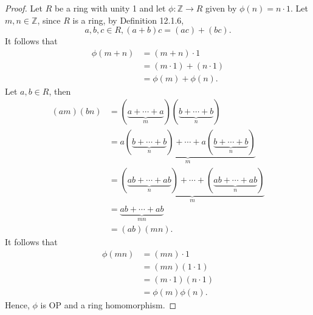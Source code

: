 \documentclass{article}
\newtheorem{theorem}{Theorem}[section]
\newtheorem{corollary}{Corollary}[theorem]
\theoremstyle{definition}
\begin{document}
\noindent{}
\begin{proof}
     Let $R$ be a ring with unity 1 and let $\phi:\mathbb{Z}\to R$ given by $\phi(n)=n\cdot1$. Let $m,n\in\mathbb{Z}$, since $R$ is a ring, by Definition 12.1.6,
     \begin{equation*}
         a,b,c\in R, (a+b)c=(ac)+(bc).
     \end{equation*}
     It follows that
     \begin{align*}
         \phi(m+n)&=(m+n)\cdot1\\
         &=(m\cdot1)+(n\cdot1)\\
         &=\phi(m)+\phi(n).
     \end{align*}
     Let $a,b\in R$, then
     \begin{align*}
         (am)(bn)&=(\underbrace{a+\cdots+a}_m)(\underbrace{b+\cdots+b}_n)\\
         &=\underbrace{a(\underbrace{b+\cdots+b}_n)+\cdots+a(\underbrace{b+\cdots+b}_n)}_m \\
         &=\underbrace{(\underbrace{ab+\cdots+ab}_n)+\cdots+(\underbrace{ab+\cdots+ab}_n)}_m \\
         &=\underbrace{ab+\cdots+ab}_{mn} \\
         &=(ab)(mn).
     \end{align*}
     It follows that
     \begin{align*}
         \phi(mn)&=(mn)\cdot1 \\
         &=(mn)(1\cdot1) \\
         &=(m\cdot1)(n\cdot1) \\
         &=\phi(m)\phi(n).
     \end{align*}
     Hence, $\phi$ is OP and a ring homomorphism. 
\end{proof}

\noindent{}
\end{document}
